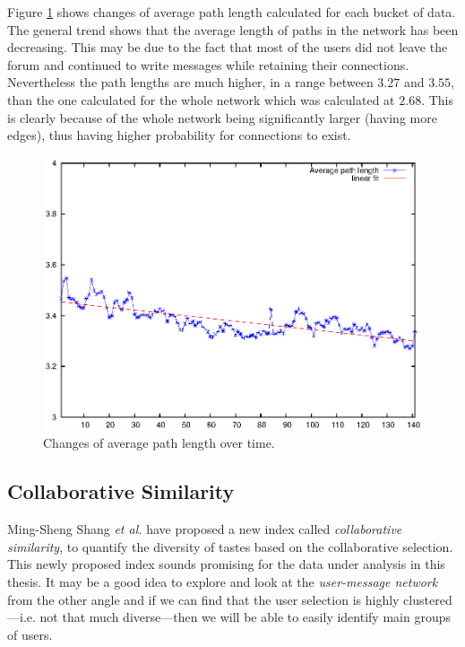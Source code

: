     Figure \ref{fig:avg_path} shows changes of average path length calculated for each bucket of data. The general trend shows that the average length of paths in the network has been decreasing. This may be due to the fact that most of the users did not leave the forum and continued to write messages while retaining their connections. Nevertheless the path lengths are much higher, in a range between $3.27$ and $3.55$, than the one calculated for the whole network which was calculated at $2.68$. This is clearly because of the whole network being significantly larger (having more edges), thus having higher probability for connections to exist.
    \begin{figure}[H]
      \centering
      \includegraphics[width=\textwidth]{chapters/03_implementation/avg_path}
      \caption{Changes of average path length over time.}
      \label{fig:avg_path}
    \end{figure}

  \subsection{Collaborative Similarity} \label{sec:cs}
    
    Ming-Sheng Shang \textit{et al.} have proposed a new index called \emph{collaborative similarity}, to quantify the diversity of tastes based on the collaborative selection\cite{Shang2010}. This newly proposed index sounds promising for the data under analysis in this thesis. It may be a good idea to explore and look at the \emph{user-message network} from the other angle and if we can find that the user selection is highly clustered---i.e. not that much diverse---then we will be able to easily identify main groups of users.
    

